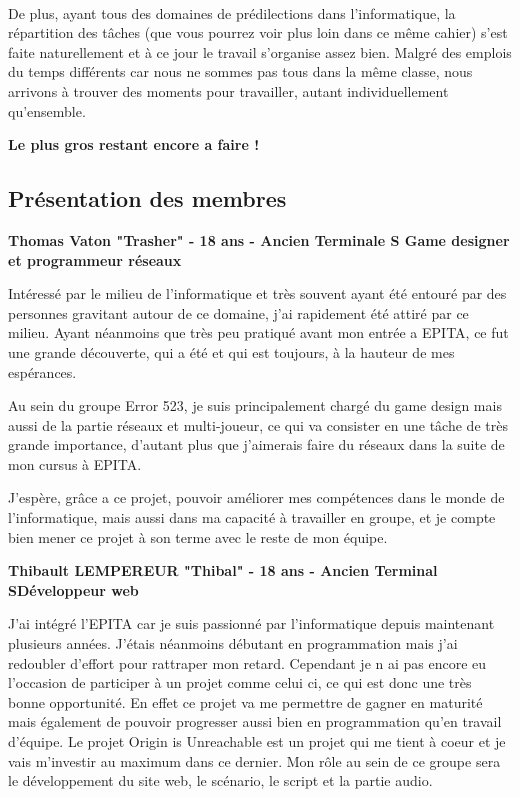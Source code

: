 \documentclass[12pt,a4paper]{article}
\begin{document}
\paragraph{}
De plus, ayant tous des domaines de prédilections dans l'informatique, la répartition des tâches (que vous pourrez voir plus loin dans ce même cahier) s'est faite naturellement et à ce jour le travail s'organise assez bien. Malgré des emplois du temps différents car nous ne sommes pas tous dans la même classe, nous arrivons à trouver des moments pour travailler, autant individuellement qu'ensemble.
\begin{center}
\textbf{Le plus gros restant encore a faire !}
\end{center}
\newpage
\subsection{Présentation des membres}

\begin{center}
\textbf{Thomas Vaton "Trasher" - 18 ans - Ancien Terminale S\newline
Game designer et programmeur réseaux}
\end{center}

Intéressé par le milieu de l'informatique et très souvent ayant été entouré par des personnes gravitant autour de ce domaine, j'ai rapidement été attiré par ce milieu. Ayant néanmoins que très peu pratiqué avant mon entrée a EPITA, ce fut une grande découverte, qui a été et qui est toujours, à la hauteur de mes espérances.

Au sein du groupe Error 523, je suis principalement chargé du game design mais aussi de la partie réseaux et multi-joueur, ce qui va consister en une tâche de très grande importance, d'autant plus que j'aimerais faire du réseaux dans la suite de mon cursus à EPITA.

J'espère, grâce a ce projet, pouvoir améliorer mes compétences dans le monde de l'informatique, mais aussi dans ma capacité à travailler en groupe, et je compte bien mener ce projet à son terme avec le reste de mon équipe.

\begin{center}
\textbf{Thibault LEMPEREUR "Thibal" - 18 ans - Ancien Terminal S\newline Développeur web}

\end{center}

J'ai intégré l'EPITA car je suis passionné par l'informatique depuis maintenant plusieurs années. J'étais néanmoins débutant en programmation mais j'ai redoubler d'effort pour rattraper mon retard. Cependant je n ai pas encore eu l'occasion de participer à un projet comme celui ci, ce qui est donc une très bonne opportunité. En effet ce projet va me permettre de gagner en maturité mais également de pouvoir progresser aussi bien en programmation qu'en travail d'équipe. Le projet Origin is Unreachable est un projet qui me tient à coeur et je vais m'investir au maximum dans ce dernier. Mon rôle au sein de ce groupe sera le développement du site web, le scénario, le script et la partie audio. 
\end{document}
